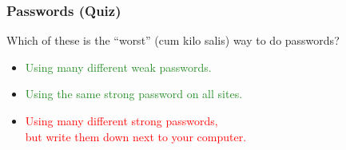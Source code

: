 \documentclass[aspectratio=1610,dvipsnames]{beamer}
\begin{document}
\begin{frame}
\frametitle{Passwords (Quiz)}

Which of these is the ``worst'' (cum kilo salis) way to do passwords?
\bigskip

\begin{itemize}
\item \textcolor{ForestGreen}{Using many different weak passwords.}
\item \textcolor{ForestGreen}{Using the same strong password on all sites.}
\item \textcolor{Red}{Using many different strong passwords,\\ but write them down next to your computer.}
\end{itemize}

\end{frame}

\end{document}

